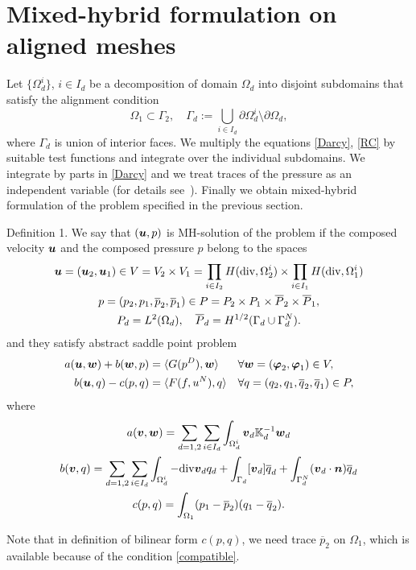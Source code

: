 \documentclass{Mamern09}
\def\div{{\rm div}}
\def\vc#1{\mathbf{\boldsymbol{#1}}}     %
\def\tn#1{{\mathbb{#1}}}    %
\def\ol#1{\overline{#1}}
\def\prtl{\partial}                                        %
\def\phi{\varphi}
\begin{document}
\section{Mixed-hybrid formulation on aligned meshes}
Let $\{\Omega_d^i\}$, $i\in I_d$ be a decomposition of domain $\Omega_d$ into disjoint subdomains
that satisfy the alignment condition
\begin{equation}\label{compatible}
 	\Omega_1\subset \Gamma_2,\quad \Gamma_d:=\bigcup_{i\in I_d} \prtl\Omega_d^i\setminus\prtl\Omega_d,
\end{equation}
where $\Gamma_d$ is union of interior faces. We multiply the equations \eqref{Darcy},
\eqref{RC} by suitable test functions and integrate over the individual subdomains.
We integrate by parts in \eqref{Darcy} and we treat traces of the pressure as
an independent variable (for details see~\cite{Maryska}). Finally we obtain mixed-hybrid formulation of the problem specified in the previous section.

\begin{thm}{Definition 1.}
We say that $(\vl,p)$ is MH-solution of the problem if the composed velocity $\vl$ and
the composed pressure $p$ belong to the spaces
\begin{gather}
	\label{Vspace}
	\vl=(\vl_2,\vl_1)\in V=V_2\times V_1=
		\prod_{i\in I_2} H(\div,\Omega_2^i)\times \prod_{i\in I_1} H(\div,\Omega_1^i)\\
	\label{Pspace}	
    p=(p_2,p_1,\ol{p}_2,\ol{p}_1)\in P=P_2\times P_1\times \ol{P}_2\times\ol{P}_1,\\
    \notag
    P_d=L^2(\Omega_d),\quad \ol{P}_d=H^{1/2}(\Gamma_d\cup\Gamma_d^N).
\end{gather}
and they satisfy abstract saddle point problem
\begin{align}
        \label{Saddle1}
 a(\vl,\vc w) + b(\vc w, p) &= \langle G(p^D), \vc w \rangle &&\forall \vc w=(\vc\phi_2,\vc\phi_1)\in V,\\
        \label{Saddle2}
 b(\vl, q) - c(p,q) &= \langle F(f,u^N), q \rangle &&\forall q=(q_2,q_1,\ol{q}_2,\ol{q}_1) \in P,
\end{align}
where
\begin{gather*}
 a(\vc v,\vc w)=\sum_{d=1,2}\sum_{i\in I_d} \int_{\Omega_d^i} \vc v_d \tn K_d^{-1} \vc w_d\\
 b(\vc v,q)=\sum_{d=1,2}\sum_{i\in I_d} \int_{\Omega_d^i} -\div\vc v_d q_d
 	+\int_{\Gamma_d} [\vc v_d]\ol{q}_d+\int_{\Gamma_d^N} (\vc v_d\cdot \vc n)\ol{q}_d\\
 c(p,q)=\int_{\Omega_1} (p_1-\ol{p}_2)(q_1-\ol{q}_2).
 \label{Cform}
\end{gather*}
\end{thm}
Note that in definition of bilinear form $c(p,q)$, we need trace $\ol{p}_2$ on $\Omega_1$,
which is available because of the condition \eqref{compatible}.
\end{document}
